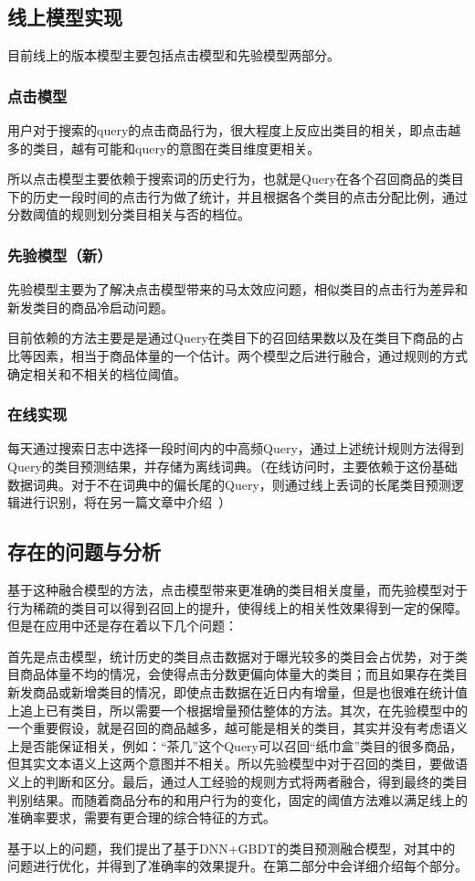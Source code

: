 \subsection{线上模型实现}
目前线上的版本模型主要包括点击模型和先验模型两部分。
\subsubsection{点击模型}
用户对于搜索的query的点击商品行为，很大程度上反应出类目的相关，即点击越多的类目，越有可能和query的意图在类目维度更相关。
\par 所以点击模型主要依赖于搜索词的历史行为，也就是Query在各个召回商品的类目下的历史一段时间的点击行为做了统计，并且根据各个类目的点击分配比例，通过分数阈值的规则划分类目相关与否的档位。 
\subsubsection{先验模型（新）}
先验模型主要为了解决点击模型带来的马太效应问题，相似类目的点击行为差异和新发类目的商品冷启动问题。
\par 目前依赖的方法主要是是通过Query在类目下的召回结果数以及在类目下商品的占比等因素，相当于商品体量的一个估计。两个模型之后进行融合，通过规则的方式确定相关和不相关的档位阈值。
\subsubsection{在线实现}
每天通过搜索日志中选择一段时间内的中高频Query，通过上述统计规则方法得到Query的类目预测结果，并存储为离线词典。（在线访问时，主要依赖于这份基础数据词典。对于不在词典中的偏长尾的Query，则通过线上丢词的长尾类目预测逻辑进行识别，将在另一篇文章中介绍~）
\subsection{存在的问题与分析}
基于这种融合模型的方法，点击模型带来更准确的类目相关度量，而先验模型对于行为稀疏的类目可以得到召回上的提升，使得线上的相关性效果得到一定的保障。但是在应用中还是存在着以下几个问题：
\par 首先是点击模型，统计历史的类目点击数据对于曝光较多的类目会占优势，对于类目商品体量不均的情况，会使得点击分数更偏向体量大的类目；而且如果存在类目新发商品或新增类目的情况，即使点击数据在近日内有增量，但是也很难在统计值上追上已有类目，所以需要一个根据增量预估整体的方法。其次，在先验模型中的一个重要假设，就是召回的商品越多，越可能是相关的类目，其实并没有考虑语义上是否能保证相关，例如：“茶几”这个Query可以召回“纸巾盒”类目的很多商品，但其实文本语义上这两个意图并不相关。所以先验模型中对于召回的类目，要做语义上的判断和区分。最后，通过人工经验的规则方式将两者融合，得到最终的类目判别结果。而随着商品分布的和用户行为的变化，固定的阈值方法难以满足线上的准确率要求，需要有更合理的综合特征的方式。
\par 基于以上的问题，我们提出了基于DNN+GBDT的类目预测融合模型，对其中的问题进行优化，并得到了准确率的效果提升。在第二部分中会详细介绍每个部分。
